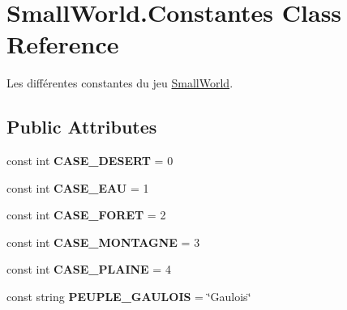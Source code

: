 \hypertarget{class_small_world_1_1_constantes}{\section{Small\-World.\-Constantes Class Reference}
\label{class_small_world_1_1_constantes}
}


Les différentes constantes du jeu \hyperlink{namespace_small_world}{Small\-World}.  


\subsection*{Public Attributes}
\begin{DoxyCompactItemize}
\item 
\hypertarget{class_small_world_1_1_constantes_a23455cae9ae5636a7b927748658f2bdf}{const int {\bfseries C\-A\-S\-E\-\_\-\-D\-E\-S\-E\-R\-T} = 0}\label{class_small_world_1_1_constantes_a23455cae9ae5636a7b927748658f2bdf}

\item 
\hypertarget{class_small_world_1_1_constantes_a9987d45381c9d786e7d57ac2e307661c}{const int {\bfseries C\-A\-S\-E\-\_\-\-E\-A\-U} = 1}\label{class_small_world_1_1_constantes_a9987d45381c9d786e7d57ac2e307661c}

\item 
\hypertarget{class_small_world_1_1_constantes_a6661fb0a373e616a7d8fe1217d59eeca}{const int {\bfseries C\-A\-S\-E\-\_\-\-F\-O\-R\-E\-T} = 2}\label{class_small_world_1_1_constantes_a6661fb0a373e616a7d8fe1217d59eeca}

\item 
\hypertarget{class_small_world_1_1_constantes_a720fc71ee09486e9a54c26a693472b73}{const int {\bfseries C\-A\-S\-E\-\_\-\-M\-O\-N\-T\-A\-G\-N\-E} = 3}\label{class_small_world_1_1_constantes_a720fc71ee09486e9a54c26a693472b73}

\item 
\hypertarget{class_small_world_1_1_constantes_a54cd0a73893539af192cb2e5964cab39}{const int {\bfseries C\-A\-S\-E\-\_\-\-P\-L\-A\-I\-N\-E} = 4}\label{class_small_world_1_1_constantes_a54cd0a73893539af192cb2e5964cab39}

\item 
\hypertarget{class_small_world_1_1_constantes_a53e6236fc2206e6016df7d3b54dee83e}{const string {\bfseries P\-E\-U\-P\-L\-E\-\_\-\-G\-A\-U\-L\-O\-I\-S} = \char`\"{}Gaulois\char`\"{}}\label{class_small_world_1_1_constantes_a53e6236fc2206e6016df7d3b54dee83e}


\end{DoxyCompactItemize}

